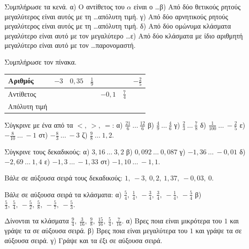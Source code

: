 

\ex Συμπλήρωσε τα κενά. α) Ο αντίθετος του $\alpha$ είναι ο \ldots \quad β) Από δύο θετικούς ρητούς μεγαλύτερος είναι αυτός με τη \ldots απόλυτη τιμή. \quad γ) Από δύο αρνητικούς ρητούς μεγαλύτερος είναι αυτός με τη \ldots απόλυτη τιμή. \quad δ) Από δύο ομώνυμα κλάσματα μεγαλύτερο είναι αυτό με τον μεγαλύτερο \ldots \quad ε) Από δύο κλάσματα με ίδιο αριθμητή μεγαλύτερο είναι αυτό με τον \ldots παρονομαστή.

\ex Συμπλήρωσε τον πίνακα.

\begin{center}
\renewcommand{\arraystretch}{1.6}
\begin{tabular}{|l|c|c|c|c|c|c|}
\hline
Αριθμός & $-3$ & $0{,}35$ & $\frac{1}{9}$ & & & $-\frac{2}{5}$\\
\hline
Αντίθετος & & & & $-0{,}1$ & $\frac{7}{4}$ & \\
\hline
Απόλυτη τιμή & & & & & & \\
\hline
\end{tabular}
\end{center}

\ex Σύγκρινε με ένα από τα $<,\ >,\ =$: α) $\frac{21}{6}\ \ldots\ \frac{12}{6}$ \quad β) $\frac{4}{9}\ \ldots\ \frac{4}{6}$ \quad γ) $\frac{2}{3}\ \ldots\ \frac{7}{8}$ \quad δ) $\frac{1}{100}\ \ldots\ -\frac{2}{5}$ \quad ε) $-\frac{8}{10}\ \ldots\ -1$ \quad στ) $-\frac{8}{3}\ \ldots\ -3$ \quad ζ) $\frac{9}{8}\ \ldots\ 1{,}2$.

\ex Σύγκρινε τους δεκαδικούς: α) $3{,}16\ \ldots\ 3{,}2$ \quad β) $0{,}092\ \ldots\ 0{,}087$ \quad γ) $-1{,}36\ \ldots\ -0{,}01$ \quad δ) $-2{,}69\ \ldots\ 1{,}4$ \quad ε) $-1{,}3\ \ldots\ -1{,}33$ \quad στ) $-1{,}10\ \ldots\ -1{,}1$.

\ex Βάλε σε αύξουσα σειρά τους δεκαδικούς: $1,\ -3,\ 0{,}2,\ 1{,}37,\ -0{,}03,\ 0$.

\ex Βάλε σε αύξουσα σειρά τα κλάσματα: α) $\frac{5}{4},\ \frac{1}{4},\ -\frac{3}{4},\ \frac{3}{4},\ -\frac{1}{4},\ -\frac{5}{4}$ \quad β) $\frac{5}{3},\ \frac{5}{4},\ -\frac{5}{2},\ \frac{5}{8},\ -\frac{5}{7},\ -\frac{5}{3}$.

\ex Δίνονται τα κλάσματα $\frac{9}{4},\ \frac{3}{16},\ \frac{9}{8},\ \frac{15}{16},\ \frac{5}{4},\ \frac{7}{16}$. α) Βρες ποια είναι μικρότερα του $1$ και γράψε τα σε αύξουσα σειρά. β) Βρες ποια είναι μεγαλύτερα του $1$ και γράψε τα σε αύξουσα σειρά. γ) Γράψε και τα έξι σε αύξουσα σειρά.

